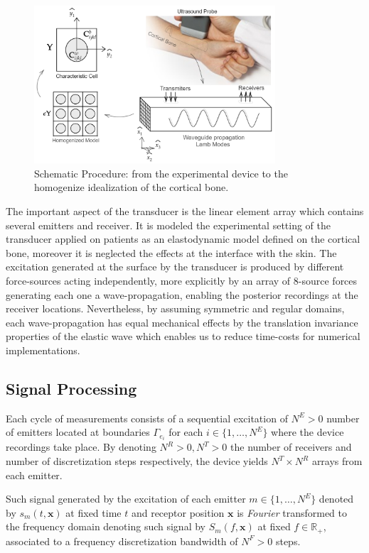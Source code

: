 \begin{figure}[!h]
	\centering
	\includegraphics[width=0.8\textwidth]{images/ImgExt/SchematicPropagation.png}
	\caption{Schematic Procedure: from the experimental device to the homogenize idealization of the cortical bone.}
	\label{SchematicProp&Hom}
\end{figure} 

The important aspect of the transducer is the linear element array which contains several emitters and receiver. It is modeled the experimental setting of the transducer applied on patients as an elastodynamic model defined on the cortical bone, moreover it is neglected the effects at the interface with the skin. The excitation generated at the surface by the transducer is produced by different force-sources acting independently, more explicitly by an array of 8-source forces generating each one a wave-propagation, enabling the posterior recordings at the receiver locations. Nevertheless, by assuming symmetric and regular domains, each wave-propagation has equal mechanical effects by the translation invariance properties of the elastic wave which enables us to reduce time-costs for numerical implementations. 

\subsection{Signal Processing}
Each cycle of measurements consists of a sequential excitation of $N^E > 0$ number of emitters located at boundaries $\Gamma_{e_i}$ for each $i \in \{1,\dots, N^E\}$ where the device recordings take place. By denoting $N^R>0, N^T>0$ the number of receivers and number of discretization steps respectively, the device yields $N^T \times N^R$ arrays from each emitter.

Such signal generated by the excitation of each emitter $m \in \{1,\dots, N^E\}$ denoted by $s_m(t, \mathbf{x})$ at fixed time $t$ and receptor position $\mathbf{x}$ is \textit{Fourier} transformed to the frequency domain denoting such signal by $S_m(f, \mathbf{x})$ at fixed $f \in \mathbb{R}_+$, associated to a frequency discretization bandwidth of $N^F > 0$ steps.

